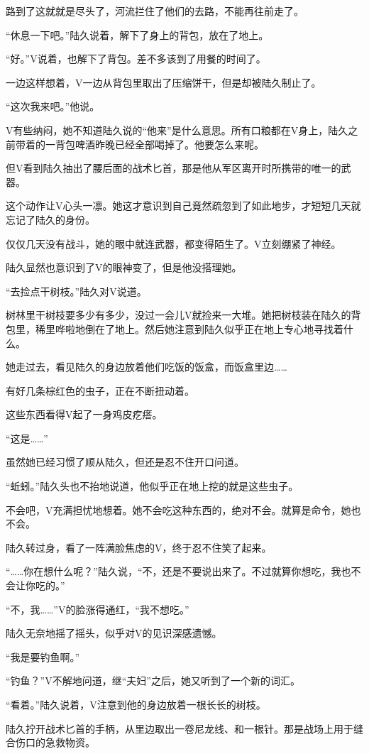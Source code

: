 路到了这就就是尽头了，河流拦住了他们的去路，不能再往前走了。

“休息一下吧。”陆久说着，解下了身上的背包，放在了地上。

“好。”V说着，也解下了背包。差不多该到了用餐的时间了。

一边这样想着，V一边从背包里取出了压缩饼干，但是却被陆久制止了。

“这次我来吧。”他说。

V有些纳闷，她不知道陆久说的“他来”是什么意思。所有口粮都在V身上，陆久之前带着的一背包啤酒昨晚已经全部喝掉了。他要怎么来呢。

但V看到陆久抽出了腰后面的战术匕首，那是他从军区离开时所携带的唯一的武器。

这个动作让V心头一凛。她这才意识到自己竟然疏忽到了如此地步，才短短几天就忘记了陆久的身份。

仅仅几天没有战斗，她的眼中就连武器，都变得陌生了。V立刻绷紧了神经。

陆久显然也意识到了V的眼神变了，但是他没搭理她。

“去捡点干树枝。”陆久对V说道。

树林里干树枝要多少有多少，没过一会儿V就捡来一大堆。她把树枝装在陆久的背包里，稀里哗啦地倒在了地上。然后她注意到陆久似乎正在地上专心地寻找着什么。

她走过去，看见陆久的身边放着他们吃饭的饭盒，而饭盒里边……

有好几条棕红色的虫子，正在不断扭动着。

这些东西看得V起了一身鸡皮疙瘩。

“这是……”

虽然她已经习惯了顺从陆久，但还是忍不住开口问道。

“蚯蚓。”陆久头也不抬地说道，他似乎正在地上挖的就是这些虫子。

不会吧，V充满担忧地想着。她不会吃这种东西的，绝对不会。就算是命令，她也不会。

陆久转过身，看了一阵满脸焦虑的V，终于忍不住笑了起来。

“……你在想什么呢？”陆久说，“不，还是不要说出来了。不过就算你想吃，我也不会让你吃的。”

“不，我……”V的脸涨得通红，“我不想吃。”

陆久无奈地摇了摇头，似乎对V的见识深感遗憾。

“我是要钓鱼啊。”

“钓鱼？”V不解地问道，继“夫妇”之后，她又听到了一个新的词汇。

“看着。”陆久说着，V注意到他的身边放着一根长长的树枝。

陆久拧开战术匕首的手柄，从里边取出一卷尼龙线、和一根针。那是战场上用于缝合伤口的急救物资。

